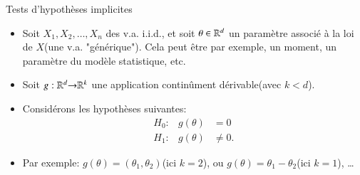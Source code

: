\begin{frame}
    [allowframebreaks]{Tests d'hypothèses implicites}
    \begin{itemize}
        \item Soit $X_1, X_2, \ldots, X_n$ des v.a. i.i.d., et soit $\theta\in\mathbb{R}^d$ un paramètre associé à la loi de $X$(une v.a. "générique"). 
        Cela peut être par exemple, un moment, un paramètre du modèle statistique, etc.
        \item Soit $g:\mathbb{R}^d{\rightarrow}\mathbb{R}^k$ une application continûment dérivable(avec $k<d$).
        \item Considérons les hypothèses suivantes:
        \[
        \begin{array}{lll}
            H_0:&g(\theta)  &= 0\\
            H_1:&g(\theta)  &\neq 0.
        \end{array}\]
        \item Par exemple: $g(\theta) = (\theta_1, \theta_2)$(ici $k=2$), ou $g(\theta) = \theta_1-\theta_2$(ici $k=1$), \ldots
    

\end{itemize}
\end{frame}
